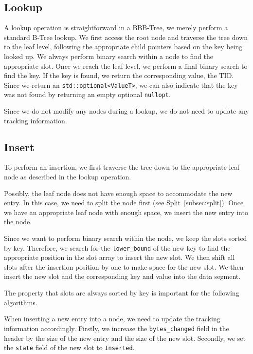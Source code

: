 

\subsection*{Lookup}
A lookup operation is straightforward in a BBB-Tree, we merely perform a standard B-Tree lookup.
We first access the root node and traverse the tree down to the leaf level, following the appropriate child pointers based on the key being looked up.
We always perform binary search within a node to find the appropriate slot. 
Once we reach the leaf level, we perform a final binary search to find the key.
If the key is found, we return the corresponding value, the \ac{TID}.
Since we return an \texttt{std::optional<ValueT>}, we can also indicate that the key was not found by returning an empty optional \texttt{nullopt}.

Since we do not modify any nodes during a lookup, we do not need to update any tracking information.

\subsection*{Insert}
To perform an insertion, we first traverse the tree down to the appropriate leaf node as described in the lookup operation.

Possibly, the leaf node does not have enough space to accommodate the new entry.
In this case, we need to split the node first (see Split~\ref{subsec:split}).
Once we have an appropriate leaf node with enough space, we insert the new entry into the node.

Since we want to perform binary search within the node, we keep the slots sorted by key.
Therefore, we search for the \texttt{lower\_bound} of the new key to find the appropriate position in the slot array to insert the new slot.
We then shift all slots after the insertion position by one to make space for the new slot.
We then insert the new slot and the corresponding key and value into the data segment.

The property that slots are always sorted by key is important for the following algorithms.

When inserting a new entry into a node, we need to update the tracking information accordingly.
Firstly, we increase the \texttt{bytes\_changed} field in the header by the size of the new entry and the size of the new slot.
Secondly, we set the \texttt{state} field of the new slot to \texttt{Inserted}.


